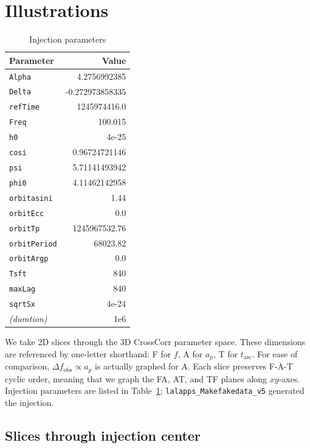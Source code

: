 \documentclass{article}
\begin{document}
\section{Illustrations}


\begin{table}
\begin{center}
\begin{tabular}{lr}
\textbf{Parameter} & \textbf{Value}\\
\hline
\texttt{Alpha} & 4.2756992385\\
\texttt{Delta} & -0.272973858335\\
\texttt{refTime} & 1245974416.0\\
\texttt{Freq} & 100.015\\
\texttt{h0} & 4e-25\\
\texttt{cosi} & 0.96724721146\\
\texttt{psi} & 5.71141493942\\
\texttt{phi0} & 4.11462142958\\
\texttt{orbitasini} & 1.44\\
\texttt{orbitEcc} & 0.0\\
\texttt{orbitTp} & 1245967532.76\\
\texttt{orbitPeriod} & 68023.82\\
\texttt{orbitArgp} & 0.0\\
\hline
\texttt{Tsft} & 840\\
\texttt{maxLag} & 840\\
\texttt{sqrtSx} & 4e-24\\
\hline
\textit{(duration)} & 1e6
\end{tabular}
\caption{Injection parameters}
\label{injection_table}
\end{center}
\end{table}



We take 2D slices through the 3D CrossCorr parameter space.
These dimensions are referenced by one-letter shorthand: F for $f$, A for $a_p$, T for $t_\mathrm{asc}$.
For ease of comparison, $\Delta f_\mathrm{obs} \propto a_p$ is actually graphed for A.
Each slice preserves F-A-T cyclic order, meaning that we graph the FA, AT, and TF planes along $xy$-axes.
Injection parameters are listed in Table~\ref{injection_table}; \texttt{lalapps\_Makefakedata\_v5} generated the injection.



\subsection{Slices through injection center}
\end{document}
